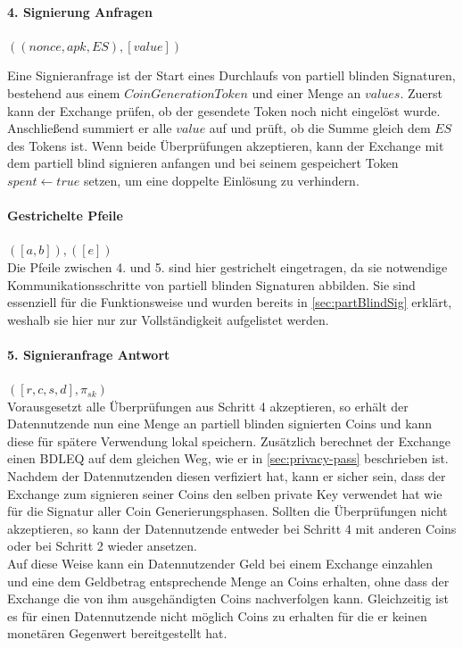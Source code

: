 \documentclass[11pt,a4paper]{scrreprt}
\begin{document}
\paragraph{4. Signierung Anfragen} $((nonce, apk, ES), [value])$

Eine Signieranfrage ist der Start eines Durchlaufs von partiell blinden Signaturen, bestehend aus einem $CoinGenerationToken$ und einer Menge an $values$. Zuerst kann der Exchange prüfen, ob der gesendete Token noch nicht eingelöst wurde. Anschließend summiert er alle $value$ auf und prüft, ob die Summe gleich dem $ES$ des Tokens ist. Wenn beide Überprüfungen akzeptieren, kann der Exchange mit dem partiell blind signieren anfangen und bei seinem gespeichert Token $spent \leftarrow true$ setzen, um eine doppelte Einlösung zu verhindern.

\paragraph*{Gestrichelte Pfeile} $([a,b]), ([e])$\\
Die Pfeile zwischen 4. und 5. sind hier gestrichelt eingetragen, da sie notwendige Kommunikationsschritte von partiell blinden Signaturen abbilden. Sie sind essenziell für die Funktionsweise und wurden bereits in \ref{sec:partBlindSig} erklärt, weshalb sie hier nur zur Vollständigkeit aufgelistet werden.

\paragraph{5. Signieranfrage Antwort} $([r,c,s,d], \pi_{sk})$ \\
Vorausgesetzt alle Überprüfungen aus Schritt 4 akzeptieren, so erhält der Datennutzende nun eine Menge an partiell blinden signierten Coins und kann diese für spätere Verwendung lokal speichern. Zusätzlich berechnet der Exchange einen BDLEQ auf dem gleichen Weg, wie er in \ref{sec:privacy-pass} beschrieben ist. Nachdem der  Datennutzenden diesen verfiziert hat, kann er sicher sein, dass der Exchange zum signieren seiner Coins den selben private Key verwendet hat wie für die Signatur aller Coin Generierungsphasen. Sollten die Überprüfungen nicht akzeptieren, so kann der Datennutzende entweder bei Schritt 4 mit anderen Coins oder bei Schritt 2 wieder ansetzen.\\

Auf diese Weise kann ein Datennutzender Geld bei einem Exchange einzahlen und eine dem Geldbetrag entsprechende Menge an Coins erhalten, ohne dass der Exchange die von ihm ausgehändigten Coins nachverfolgen kann. Gleichzeitig ist es für einen Datennutzende nicht möglich Coins zu erhalten für die er keinen monetären Gegenwert bereitgestellt hat.
\end{document}
